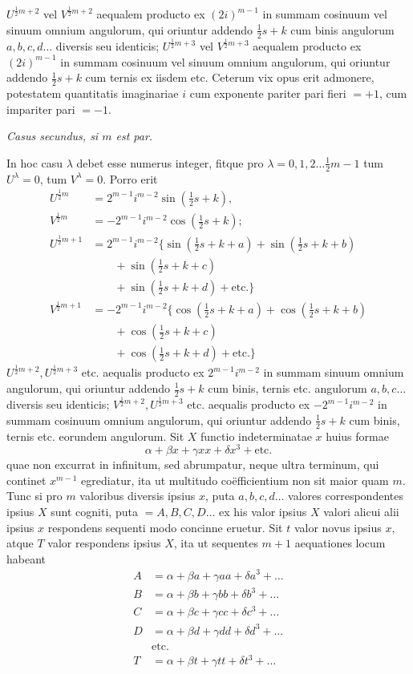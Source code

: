 $U^{\frac12m+2}$ vel $V^{\frac12m+2}$ aequalem producto ex $(2i)^{m-1}$ in summam cosinuum vel sinuum omnium angulorum, qui oriuntur addendo $\frac12s+k$ cum binis angulorum $a,b,c,d\ldots$ diversis seu identicis; $U^{\frac12m+3}$ vel $V^{\frac12m+3}$ aequalem producto ex $(2i)^{m-1}$ in summam cosinuum vel sinuum omnium angulorum, qui oriuntur addendo $\frac12s+k$ cum ternis ex iisdem etc. Ceterum vix opus erit admonere, potestatem quantitatis imaginariae $i$ cum exponente pariter pari fieri $=+1$, cum impariter pari $=-1$.
\begin{center}\textit{Casus secundus, si $m$ est par.}\end{center}
In hoc casu $\lambda$ debet esse numerus integer, fitque pro $\lambda=0,1,2\ldots\frac12m-1$ tum $U^\lambda=0$, tum $V^\lambda=0$. Porro erit
\[
\begin{aligned}
U^{\frac12m}&=2^{m-1}i^{m-2}\sin(\tfrac12s+k),\\
V^{\frac12m}&=-2^{m-1}i^{m-2}\cos(\tfrac12s+k);\\
U^{\frac12m+1}&=2^{m-1}i^{m-2}\{\sin(\tfrac12s+k+a)+\sin(\tfrac12s+k+b)\\&\qquad+\sin(\tfrac12s+k+c)\\
&\qquad+\sin(\tfrac12s+k+d)+\text{etc.}\}\\
V^{\frac12m+1}&=-2^{m-1}i^{m-2}\{\cos(\tfrac12s+k+a)+\cos(\tfrac12s+k+b)\\&\qquad+\cos(\tfrac12s+k+c)\\
&\qquad+\cos(\tfrac12s+k+d)+\text{etc.}\}
\end{aligned}
\]
$U^{\frac12m+2},U^{\frac12m+3}$ etc. aequalis producto ex $2^{m-1}i^{m-2}$ in summam sinuum omnium angulorum, qui oriuntur addendo $\frac12s+k$ cum binis, ternis etc. angulorum $a,b,c\ldots$ diversis seu identicis; $V^{\frac12m+2},U^{\frac12m+3}$ etc. aequalis producto ex $-2^{m-1}i^{m-2}$ in summam cosinuum omnium angulorum, qui oriuntur addendo $\frac12s+k$ cum binis, ternis etc. eorundem angulorum.
Sit $X$ functio indeterminatae $x$ huius formae
\[
\alpha+\beta x+\gamma xx+\delta x^3+\text{etc.}
\]
quae non excurrat in infinitum, sed abrumpatur, neque ultra terminum, qui continet $x^{m-1}$ egrediatur, ita ut multitudo coëfficientium non sit maior quam $m$. Tunc si pro $m$ valoribus diversis ipsius $x$, puta $a,b,c,d\ldots$ valores correspondentes ipsius $X$ sunt cogniti, puta $=A,B,C,D\ldots$ ex his valor ipsius $X$ valori alicui alii ipsius $x$ respondens sequenti modo concinne eruetur. Sit $t$ valor novus ipsius $x$, atque $T$ valor respondens ipsius $X$, ita ut sequentes $m+1$ aequationes locum habeant
\[
\begin{aligned}
A&=\alpha+\beta a+\gamma aa+\delta a^3+\ldots\\
B&=\alpha+\beta b+\gamma bb+\delta b^3+\ldots\\
C&=\alpha+\beta c+\gamma cc+\delta c^3+\ldots\\
D&=\alpha+\beta d+\gamma dd+\delta d^3+\ldots\\
&\text{etc.}\\
T&=\alpha+\beta t+\gamma tt+\delta t^3+\ldots
\end{aligned}
\]
\endgroup
